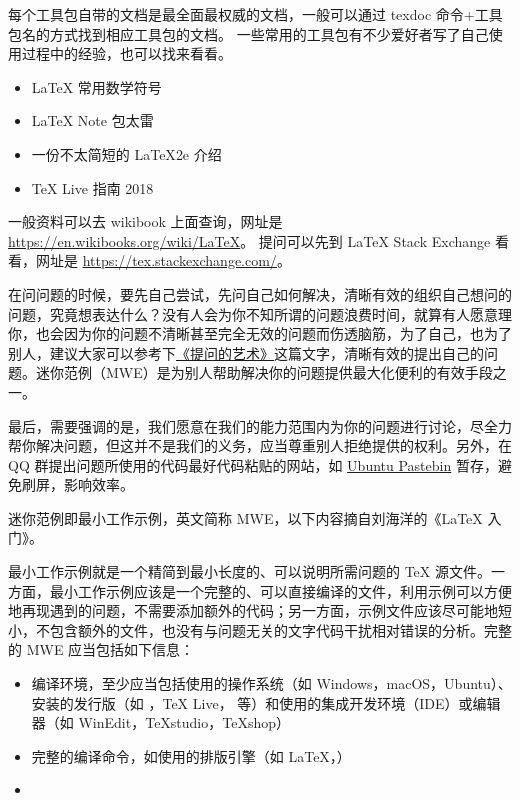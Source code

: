 





每个工具包自带的文档是最全面最权威的文档，一般可以通过 texdoc 
命令+工具包名的方式找到相应工具包的文档。
一些常用的工具包有不少爱好者写了自己使用过程中的经验，也可以找来看看。


\begin{itemize}
  \item \LaTeX{} 常用数学符号
  \item \LaTeX{} Note 包太雷
  \item 一份不太简短的 \LaTeX{2e} 介绍
  \item \TeX{} Live 指南 2018
\end{itemize}


一般资料可以去 wikibook 上面查询，网址是
\url{https://en.wikibooks.org/wiki/LaTeX}。
提问可以先到 \LaTeX{} Stack Exchange 看看，网址是
\url{https://tex.stackexchange.com/}。



在问问题的时候，要先自己尝试，先问自己如何解决，清晰有效的组织自己想问的问题，究竟想表达什么？没有人会为你不知所谓的问题浪费时间，就算有人愿意理你，也会因为你的问题不清晰甚至完全无效的问题而伤透脑筋，为了自己，也为了别人，建议大家可以参考下\href{https://www.jianshu.com/p/f96aa7f7bf59}{《提问的艺术》}这篇文字，清晰有效的提出自己的问题。迷你范例（MWE）是为别人帮助解决你的问题提供最大化便利的有效手段之一。

最后，需要强调的是，我们愿意在我们的能力范围内为你的问题进行讨论，尽全力帮你解决问题，但这并不是我们的义务，应当尊重别人拒绝提供的权利。另外，在 QQ 群提出问题所使用的代码最好代码粘贴的网站，如
\href{https://paste.ubuntu.com/}{Ubuntu Pastebin}
暂存，避免刷屏，影响效率。


迷你范例即最小工作示例，英文简称 MWE，以下内容摘自刘海洋的《\LaTeX{} 入门》。

最小工作示例就是一个精简到最小长度的、可以说明所需问题的 \TeX{} 源文件。一方面，最小工作示例应该是一个完整的、可以直接编译的文件，利用示例可以方便地再现遇到的问题，不需要添加额外的代码；另一方面，示例文件应该尽可能地短小，不包含额外的文件，也没有与问题无关的文字代码干扰相对错误的分析。完整的 MWE 应当包括如下信息：
\begin{itemize}
  \item 编译环境，至少应当包括使用的操作系统（如 Windows，macOS，Ubuntu）、安装的发行版（如 \CTeX{}，\TeX{} Live，\MacTeX{} 等）和使用的集成开发环境（IDE）或编辑器（如 WinEdit，TeXstudio，TeXshop）
  \item 完整的编译命令，如使用的排版引擎（如 \LaTeX{}，\XeLaTeX{}）
  \item 
\end{itemize}

